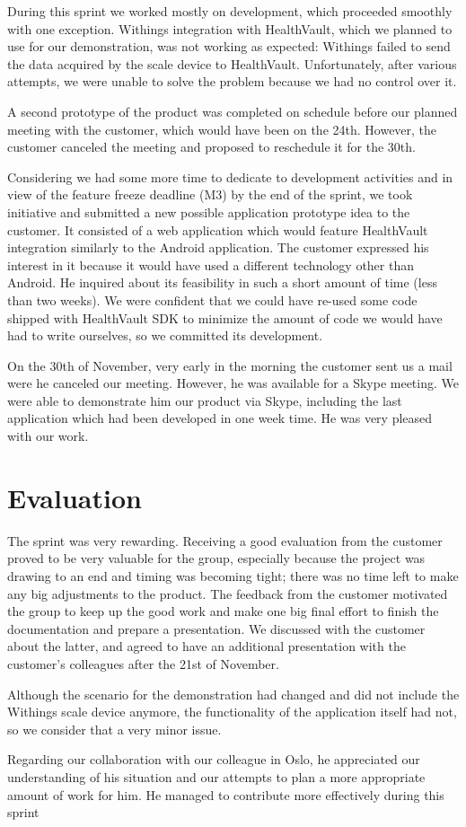 During this sprint we worked mostly on development, which proceeded smoothly
with one exception. Withings integration with HealthVault, which we planned to use for
our demonstration, was not working as expected: Withings failed to send the data acquired
by the scale device to HealthVault. Unfortunately, after various attempts, we were unable to
solve the problem because we had no control over it.

A second prototype of the product was completed on schedule before our
planned meeting with the customer, which would have been on the 24th.
However, the customer canceled the meeting and proposed to reschedule it for the 30th.

Considering we had some more time to dedicate to development activities and in view
of the feature freeze deadline (M3) by the end of the sprint, we took initiative
and submitted a new possible application prototype idea to the customer.
It consisted of a web application which would feature HealthVault integration
similarly to the Android application.
The customer expressed his interest in it because it would have used a different
technology other than Android. He inquired about its feasibility in such a short amount
of time (less than two weeks). We were confident that we could have re-used some code
shipped with HealthVault SDK to minimize the amount of code we would have had to write
ourselves, so we committed its development.

On the 30th of November, very early in the morning the customer sent us a mail
were he canceled our meeting. However, he was available for a Skype meeting.
We were able to demonstrate him our product via Skype, including the last application
which had been developed in one week time. He was very pleased with our work.

\section{Evaluation}

The sprint was very rewarding.
Receiving a good evaluation from the customer proved to be very valuable for the group,
especially because the project was drawing to an end and timing was becoming tight;
there was no time left to make any big adjustments to the product.
The feedback from the customer motivated the group to keep up the good work
and make one big final effort to finish the documentation and prepare a presentation.
We discussed with the customer about the latter, and agreed to have an additional
presentation with the customer's colleagues after the 21st of November.

Although the scenario for the demonstration had changed and did not include
the Withings scale device anymore, the functionality of the application itself
had not, so we consider that a very minor issue.

Regarding our collaboration with our colleague in Oslo, he appreciated
our understanding of his situation and our attempts to plan a more
appropriate amount of work for him. He managed to contribute
more effectively during this sprint


